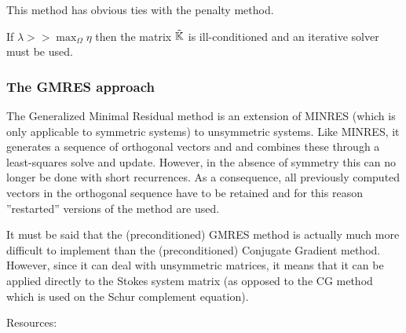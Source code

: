 \begin{remark} 
This method has obvious ties with the penalty method. 
\end{remark}

\begin{remark} 
If $\lambda >> \max_\Omega{\eta}$ then the matrix $\tilde{{\mathbb{K}}}$ is ill-conditioned and an iterative solver must be used.
\end{remark}




\subsubsection{The GMRES approach}

The Generalized Minimal Residual method \cite{sasc86} 
is an extension of MINRES (which is only applicable to symmetric systems) to unsymmetric systems. 
Like MINRES, it generates a sequence of orthogonal vectors and 
and combines these through a least-squares solve and update. However, 
in the absence of symmetry this can no longer be done with short recurrences. As a consequence, 
all previously computed vectors in the orthogonal sequence have to be retained and 
for this reason ''restarted'' versions of the method are used.

It must be said that the (preconditioned) GMRES method is actually much more difficult to implement 
than the (preconditioned) Conjugate Gradient method.
However, since it can deal with unsymmetric matrices, it means that it can be applied 
directly to the Stokes system matrix (as opposed to the CG method which is used on the Schur complement
equation).

 

Resources: \cite[p208]{eijkhout} \cite{saad} \cite{babc94}







